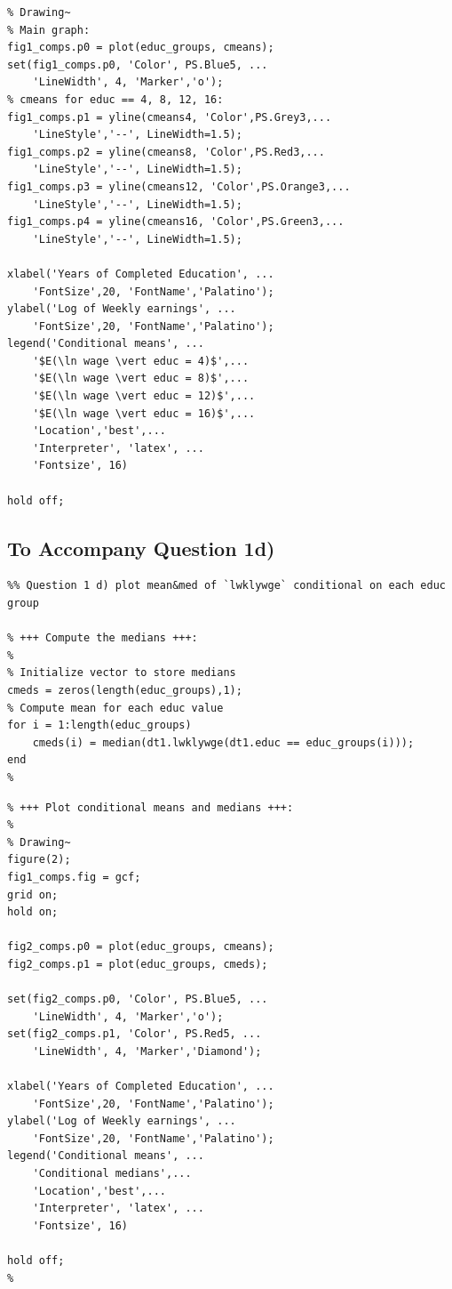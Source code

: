 \documentclass[9pt]{tufte-handout}
\begin{document}
\newpage

\begin{lstlisting}
% Drawing~
% Main graph:
fig1_comps.p0 = plot(educ_groups, cmeans);
set(fig1_comps.p0, 'Color', PS.Blue5, ...
    'LineWidth', 4, 'Marker','o');
% cmeans for educ == 4, 8, 12, 16:
fig1_comps.p1 = yline(cmeans4, 'Color',PS.Grey3,...
    'LineStyle','--', LineWidth=1.5);
fig1_comps.p2 = yline(cmeans8, 'Color',PS.Red3,...
    'LineStyle','--', LineWidth=1.5);
fig1_comps.p3 = yline(cmeans12, 'Color',PS.Orange3,...
    'LineStyle','--', LineWidth=1.5);
fig1_comps.p4 = yline(cmeans16, 'Color',PS.Green3,...
    'LineStyle','--', LineWidth=1.5);

xlabel('Years of Completed Education', ...
    'FontSize',20, 'FontName','Palatino');
ylabel('Log of Weekly earnings', ...
    'FontSize',20, 'FontName','Palatino');
legend('Conditional means', ...
    '$E(\ln wage \vert educ = 4)$',...
    '$E(\ln wage \vert educ = 8)$',...
    '$E(\ln wage \vert educ = 12)$',...
    '$E(\ln wage \vert educ = 16)$',...
    'Location','best',...
    'Interpreter', 'latex', ...
    'Fontsize', 16)

hold off;
\end{lstlisting}
\vspace{0.8cm}
\subsection{To Accompany Question 1d)}
\begin{lstlisting}
%% Question 1 d) plot mean&med of `lwklywge` conditional on each educ group

% +++ Compute the medians +++:
%
% Initialize vector to store medians
cmeds = zeros(length(educ_groups),1);
% Compute mean for each educ value
for i = 1:length(educ_groups)
    cmeds(i) = median(dt1.lwklywge(dt1.educ == educ_groups(i)));
end
%
\end{lstlisting}

\newpage
\begin{lstlisting}
% +++ Plot conditional means and medians +++:
%
% Drawing~
figure(2);
fig1_comps.fig = gcf;
grid on;
hold on;

fig2_comps.p0 = plot(educ_groups, cmeans);
fig2_comps.p1 = plot(educ_groups, cmeds);

set(fig2_comps.p0, 'Color', PS.Blue5, ...
    'LineWidth', 4, 'Marker','o');
set(fig2_comps.p1, 'Color', PS.Red5, ...
    'LineWidth', 4, 'Marker','Diamond');

xlabel('Years of Completed Education', ...
    'FontSize',20, 'FontName','Palatino');
ylabel('Log of Weekly earnings', ...
    'FontSize',20, 'FontName','Palatino');
legend('Conditional means', ...
    'Conditional medians',...
    'Location','best',...
    'Interpreter', 'latex', ...
    'Fontsize', 16)

hold off;
%
\end{lstlisting}
\end{document}
